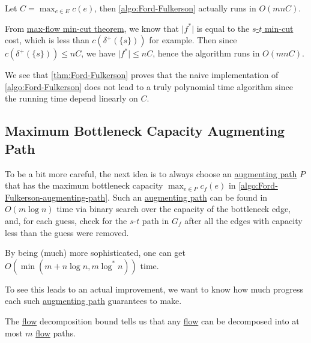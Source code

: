 \begin{remark}
	Let \(C = \max _{e \in E} c(e)\), then \autoref{algo:Ford-Fulkerson} actually runs in \(O(mnC)\).
\end{remark}
\begin{explanation}
	From \hyperref[thm:max-flow-min-cut]{max-flow min-cut theorem}, we know that \(\lvert f^{\ast} \rvert \) is equal to the \hyperref[prb:s-t-min-cut]{\(s\)-\(t\) min-cut} cost, which is less than \(c(\delta ^+(\{ s \} ))\) for example. Then since \(c(\delta ^+(\{ s \} )) \leq n C\), we have \(\lvert f^{\ast} \rvert \leq nC\), hence the algorithm runs in \(O(mnC)\).
\end{explanation}

We see that \autoref{thm:Ford-Fulkerson} proves that the naive implementation of \autoref{algo:Ford-Fulkerson} does not lead to a truly polynomial time algorithm since the running time depend linearly on \(C\).

\subsection{Maximum Bottleneck Capacity Augmenting Path}
To be a bit more careful, the next idea is to always choose an \hyperref[def:augmenting-path]{augmenting path} \(P\) that has the maximum bottleneck capacity \(\max _{e \in P} c_f(e)\) in \autoref{algo:Ford-Fulkerson-augmenting-path}. Such an \hyperref[def:augmenting-path]{augmenting path} can be found in \(O(m \log n)\) time via binary search over the capacity of the bottleneck edge, and, for each guess, check for the \(s\)-\(t\) path in \(G_f\) after all the edges with capacity less than the guess were removed.

\begin{note}
	By being (much) more sophisticated, one can get \(O(\min (m + n \log n, m \log ^{\ast} n))\) time.
\end{note}

To see this leads to an actual improvement, we want to know how much progress each such \hyperref[def:augmenting-path]{augmenting path} guarantees to make.

\begin{prev}
	The \hyperref[def:flow]{flow} decomposition bound tells us that any \hyperref[def:flow]{flow} can be decomposed into at most \(m\) \hyperref[def:flow]{flow} paths.
\end{prev}

